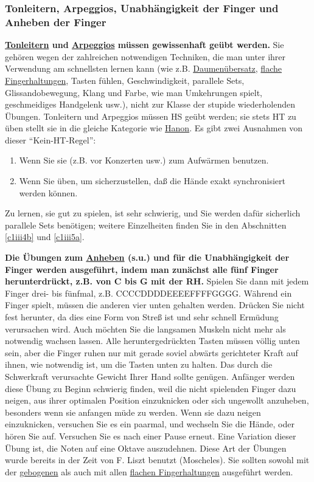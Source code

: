 
\subsubsection{Tonleitern, Arpeggios, Unabhängigkeit der Finger und Anheben der Finger}
\label{c1iii7d}

\textbf{\hyperref[c1iii5a]{Tonleitern} und \hyperref[Arpeggios]{Arpeggios} müssen gewissenhaft geübt werden.}
Sie gehören wegen der zahlreichen notwendigen Techniken, die man unter ihrer Verwendung am schnellsten lernen kann (wie z.B. \hyperref[c1iii5a]{Daumenübersatz}, \hyperref[c1iii4b]{flache Fingerhaltungen}, Tasten fühlen, Geschwindigkeit, parallele Sets, Glissandobewegung, Klang und Farbe, wie man Umkehrungen spielt, geschmeidiges Handgelenk usw.), nicht zur Klasse der stupide wiederholenden Übungen.
Tonleitern und Arpeggios müssen HS geübt werden; sie stets HT zu üben stellt sie in die gleiche Kategorie wie \hyperref[c1iii7h]{Hanon}.
Es gibt zwei Ausnahmen von dieser \enquote{Kein-HT-Regel}:

\begin{enumerate} 
 \item Wenn Sie sie (z.B. vor Konzerten usw.) zum Aufwärmen benutzen.
 \item Wenn Sie üben, um sicherzustellen, daß die Hände exakt synchronisiert werden können.
\end{enumerate}

Zu lernen, sie gut zu spielen, ist sehr schwierig, und Sie werden dafür sicherlich parallele Sets benötigen; weitere Einzelheiten finden Sie in den Abschnitten \hyperref[c1iii4b]{\autoref{c1iii4b}} und \hyperref[c1iii5a]{\autoref{c1iii5a}}.


\label{c1iii7finger}

\textbf{Die Übungen zum \hyperref[c1iii7anheben]{Anheben} (s.u.) und für die Unabhängigkeit der Finger werden ausgeführt, indem man zunächst alle fünf Finger herunterdrückt, z.B. von C bis G mit der RH.}
Spielen Sie dann mit jedem Finger drei- bis fünfmal, z.B. CCCCDDDDEEEEFFFFGGGG.
Während ein Finger spielt, müssen die anderen vier unten gehalten werden.
Drücken Sie nicht fest herunter, da dies eine Form von Streß ist und sehr schnell Ermüdung verursachen wird.
Auch möchten Sie die langsamen Muskeln nicht mehr als notwendig wachsen lassen.
Alle heruntergedrückten Tasten müssen völlig unten sein, aber die Finger ruhen nur mit gerade soviel abwärts gerichteter Kraft auf ihnen, wie notwendig ist, um die Tasten unten zu halten.
Das durch die Schwerkraft verursachte Gewicht Ihrer Hand sollte genügen.
Anfänger werden diese Übung zu Beginn schwierig finden, weil die nicht spielenden Finger dazu neigen, aus ihrer optimalen Position einzuknicken oder sich ungewollt anzuheben, besonders wenn sie anfangen müde zu werden.
Wenn sie dazu neigen einzuknicken, versuchen Sie es ein paarmal, und wechseln Sie die Hände, oder hören Sie auf.
Versuchen Sie es nach einer Pause erneut.
Eine Variation dieser Übung ist, die Noten auf eine Oktave auszudehnen.
Diese Art der Übungen wurde bereits in der Zeit von F. Liszt benutzt (Moscheles).
Sie sollten sowohl mit der \hyperref[c1ii2]{gebogenen} als auch mit allen \hyperref[c1iii4b]{flachen Fingerhaltungen} ausgeführt werden.

